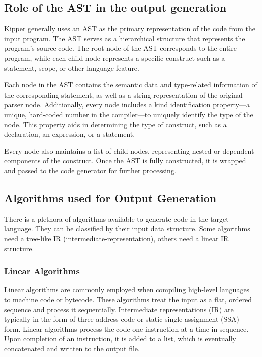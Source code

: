 \subsection{Role of the AST in the output generation}

Kipper generally uses an AST as the primary representation of the code from the input program. The AST serves as a hierarchical structure that represents the program's source code. The root node of the AST corresponds to the entire program, while each child node represents a specific construct such as a statement, scope, or other language feature.

Each node in the AST contains the semantic data and type-related information of the corresponding statement, as well as a string representation of the original parser node. Additionally, every node includes a kind identification property—a unique, hard-coded number in the compiler—to uniquely identify the type of the node. This property aids in determining the type of construct, such as a declaration, an expression, or a statement.

Every node also maintains a list of child nodes, representing nested or dependent components of the construct. Once the AST is fully constructed, it is wrapped and passed to the code generator for further processing.

\subsection{Algorithms used for Output Generation}

There is a plethora of algorithms available to generate code in the target language. They can be classified by their input data structure. Some algorithms need a tree-like IR (\Gls{intermediate-representation}), others need a linear IR structure.

\subsubsection{Linear Algorithms}

Linear algorithms are commonly employed when compiling high-level languages to machine code or bytecode. These algorithms treat the input as a flat, ordered sequence and process it sequentially. Intermediate representations (IR) are typically in the form of three-address code or static-single-assignment (SSA) form. Linear algorithms process the code one instruction at a time in sequence. Upon completion of an instruction, it is added to a list, which is eventually concatenated and written to the output file.

